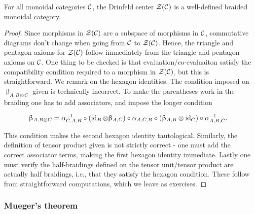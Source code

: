 \begin{prop} For all monoidal categories ${\mathcal C}$, the Drinfeld center ${\mathcal Z}({\mathcal C})$ is a well-defined braided monoidal category.
\end{prop}
\begin{proof} Since morphisms in ${\mathcal Z}({\mathcal C})$ are a subspace of morphisms in ${\mathcal C}$, commutative diagrams don't change when going from ${\mathcal C}$ to ${\mathcal Z}({\mathcal C})$. Hence, the triangle and pentagon axioms for ${\mathcal Z}({\mathcal C})$ follow immediately from the triangle and pentagon axioms on ${\mathcal C}$. One thing to be checked is that evaluation/co-evaluaiton satisfy the compatibility condition required to a morphism in ${\mathcal Z}({\mathcal C})$, but this is straightforward. We remark on the hexagon identities. The condition imposed on $\upbeta_{A,B\otimes C}$ given is technically incorrect. To make the parentheses work in the braiding one has to add associators, and impose the longer condition

$$\upbeta_{A,B\otimes C}=\alpha_{C,A,B}^{-1}\circ \left(\operatorname{id}_{B}\otimes \upbeta_{A,C}\right)\circ \alpha_{A,C,B}\circ\left(\upbeta_{A,B}\otimes \operatorname{id}_C\right)\circ \alpha^{-1}_{A,B,C}.$$

This condition makes the second hexagon identity tautological. Similarly, the definition of tensor product given is not strictly correct - one must add the correct associator terms, making the first hexagon identity immediate. Lastly one must verify the half-braidings defined on the tensor unit/tensor product are actually half braidings, i.e., that they satisfy the hexagon condition. These follow from straightforward computations, which we leave as exercises.
\end{proof}

\subsubsection{Mueger's theorem}


